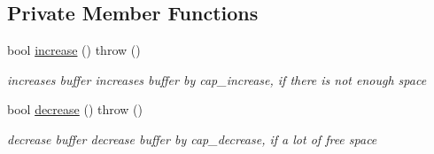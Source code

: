 \subsection*{Private Member Functions}
\begin{DoxyCompactItemize}
\item 
bool \hyperlink{classVector_afa2a3c5660a7a34794975a6bb80d175f}{increase} ()  throw ()
\begin{DoxyCompactList}\small\item\em increases buffer  increases buffer by cap\+\_\+increase, if there is not enough space \end{DoxyCompactList}\item 
bool \hyperlink{classVector_a770a5b403dcb82ea6954cda918d278d6}{decrease} ()  throw ()
\begin{DoxyCompactList}\small\item\em decrease buffer  decrease buffer by cap\+\_\+decrease, if a lot of free space \end{DoxyCompactList}\end{DoxyCompactItemize}
